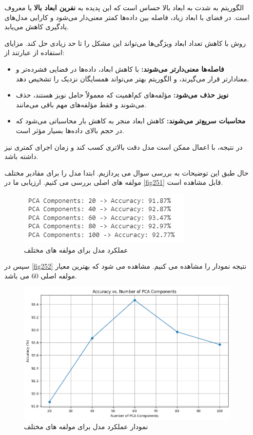 \documentclass{article}
\begin{document}
الگوریتم  به شدت به ابعاد بالا حساس است که این پدیده به \textbf{نفرین ابعاد بالا} یا  معروف است. در فضای با ابعاد زیاد، فاصله بین داده‌ها کمتر معنی‌دار می‌شود و کارایی مدل‌های یادگیری کاهش می‌یابد.

روش  با کاهش تعداد ابعاد ویژگی‌ها می‌تواند این مشکل را تا حد زیادی حل کند. مزایای استفاده از  عبارتند از:

\begin{itemize}
  \item \textbf{فاصله‌ها معنی‌دارتر می‌شوند:} با کاهش ابعاد، داده‌ها در فضایی فشرده‌تر و معنادارتر قرار می‌گیرند، و الگوریتم  بهتر می‌تواند همسایگان نزدیک را تشخیص دهد.
  \item \textbf{نویز حذف می‌شود:} مؤلفه‌های کم‌اهمیت که معمولاً حامل نویز هستند، حذف می‌شوند و فقط مؤلفه‌های مهم باقی می‌مانند.
  \item \textbf{محاسبات سریع‌تر می‌شوند:} کاهش ابعاد منجر به کاهش بار محاسباتی می‌شود که در حجم بالای داده‌ها بسیار مؤثر است.
\end{itemize}

در نتیجه، با اعمال  ممکن است مدل  دقت بالاتری کسب کند و زمان اجرای کمتری نیز داشته باشد.


حال طبق این توضیحات به بررسی سوال می پردازیم. ابتدا مدل را برای مقادیر مختلف مولفه های اصلی بررسی می کنیم. ارزیابی ما در \autoref{fig251} قابل مشاهده است.


\begin{figure}[h!]
    \centering
    \includegraphics[width=0.6\linewidth]{q2_p51.png}
    \caption{عملکرد مدل برای مولفه های مختلف}
    \label{fig251}
\end{figure}

سپس در \autoref{fig252} نتیجه نمودار را مشاهده می کنیم. مشاهده می شود که بهترین معیار مولفه اصلی 60 می باشد.


\begin{figure}[h!]
    \centering
    \includegraphics[width=0.6\linewidth]{q2_p52.png}
    \caption{نمودار عملکرد مدل برای مولفه های مختلف}
    \label{fig252}
\end{figure}
\end{document}
